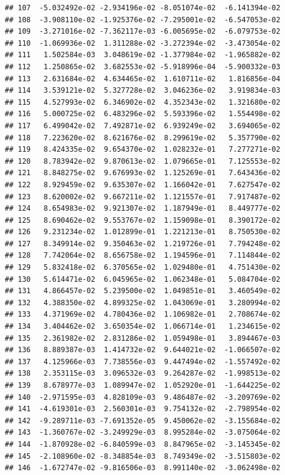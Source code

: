 \documentclass[
]{article}
\begin{document}
\begin{verbatim}
## 107  -5.032492e-02 -2.934196e-02 -8.051074e-02  -6.141394e-02
## 108  -3.908110e-02 -1.925376e-02 -7.295001e-02  -6.547053e-02
## 109  -3.271016e-02 -7.362117e-03 -6.005695e-02  -6.079753e-02
## 110  -1.069936e-02  1.311288e-02 -3.272394e-02  -3.473054e-02
## 111   1.502584e-03  3.048619e-02 -1.377984e-02  -1.965882e-02
## 112   1.250865e-02  3.682553e-02 -5.918996e-04  -5.900332e-03
## 113   2.631684e-02  4.634465e-02  1.610711e-02   1.816856e-04
## 114   3.539121e-02  5.327728e-02  3.046236e-02   3.919834e-03
## 115   4.527993e-02  6.346902e-02  4.352343e-02   1.321680e-02
## 116   5.000725e-02  6.483296e-02  5.593396e-02   1.554498e-02
## 117   6.499042e-02  7.492871e-02  6.939249e-02   3.694065e-02
## 118   7.223620e-02  8.621676e-02  8.299619e-02   5.357790e-02
## 119   8.424335e-02  9.654370e-02  1.028232e-01   7.277271e-02
## 120   8.783942e-02  9.870613e-02  1.079665e-01   7.125553e-02
## 121   8.848275e-02  9.676993e-02  1.125269e-01   7.643436e-02
## 122   8.929459e-02  9.635307e-02  1.166042e-01   7.627547e-02
## 123   8.620002e-02  9.667211e-02  1.121557e-01   7.917487e-02
## 124   8.654983e-02  9.921307e-02  1.187949e-01   8.449777e-02
## 125   8.690462e-02  9.553767e-02  1.159098e-01   8.390172e-02
## 126   9.231234e-02  1.012899e-01  1.221213e-01   8.750530e-02
## 127   8.349914e-02  9.350463e-02  1.219726e-01   7.794248e-02
## 128   7.742064e-02  8.656758e-02  1.194596e-01   7.114844e-02
## 129   5.832418e-02  6.370565e-02  1.029480e-01   4.751430e-02
## 130   5.614471e-02  6.045965e-02  1.062348e-01   5.084704e-02
## 131   4.866457e-02  5.239500e-02  1.049851e-01   3.460549e-02
## 132   4.388350e-02  4.899325e-02  1.043069e-01   3.280994e-02
## 133   4.371969e-02  4.780436e-02  1.106982e-01   2.708674e-02
## 134   3.404462e-02  3.650354e-02  1.066714e-01   1.234615e-02
## 135   2.361982e-02  2.831286e-02  1.059498e-01   3.894467e-03
## 136   8.889387e-03  1.414732e-02  9.644021e-02  -1.066507e-02
## 137   4.125966e-03  7.738556e-03  9.447494e-02  -1.557492e-02
## 138   2.353115e-03  3.096532e-03  9.264287e-02  -1.998513e-02
## 139   8.678977e-03  1.089947e-02  1.052920e-01  -1.644225e-02
## 140  -2.971595e-03  4.828109e-03  9.486487e-02  -3.209769e-02
## 141  -4.619301e-03  2.560301e-03  9.754132e-02  -2.798954e-02
## 142  -9.289711e-03 -7.691352e-05  9.450062e-02  -3.155684e-02
## 143  -1.360767e-02 -3.249929e-03  8.995284e-02  -3.075064e-02
## 144  -1.870928e-02 -6.840599e-03  8.847965e-02  -3.145345e-02
## 145  -2.108960e-02 -8.348854e-03  8.749349e-02  -3.515803e-02
## 146  -1.672747e-02 -9.816506e-03  8.991140e-02  -3.062498e-02

\end{verbatim}
\end{document}
